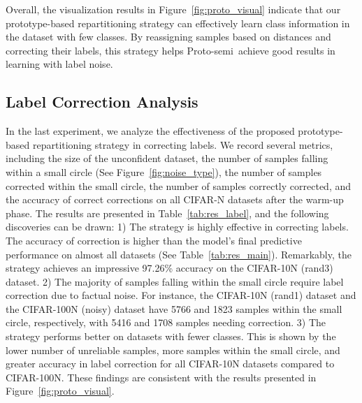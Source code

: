 \documentclass[letterpaper]{article} %
\newcommand{\method}{Proto-semi}
\begin{document}
Overall, the visualization results in Figure~\ref{fig:proto_visual} indicate that our prototype-based repartitioning strategy can effectively learn class information in the dataset with few classes. By reassigning samples based on distances and correcting their labels, this strategy helps \method\ achieve good results in learning with label noise.






\subsection{Label Correction Analysis}\label{sec:label_correct}

In the last experiment, we analyze the effectiveness of the proposed prototype-based repartitioning strategy in correcting labels. 
We record several metrics, including the size of the unconfident dataset, the number of samples falling within a small circle (See Figure~\ref{fig:noise_type}), the number of samples corrected within the small circle, the number of samples correctly corrected, and the accuracy of correct corrections on all CIFAR-N datasets after the warm-up phase. The results are presented in Table~\ref{tab:res_label}, and the following discoveries can be drawn: 1) The strategy is highly effective in correcting labels. The accuracy of correction is higher than the model's final predictive performance on almost all datasets (See Table~\ref{tab:res_main}). Remarkably, the strategy achieves an impressive 97.26\% accuracy on the CIFAR-10N (rand3) dataset. 2) The majority of samples falling within the small circle require label correction due to factual noise. For instance, the CIFAR-10N (rand1) dataset and the CIFAR-100N (noisy) dataset have 5766 and 1823 samples within the small circle, respectively, with 5416 and 1708 samples needing correction. 3) The strategy performs better on datasets with fewer classes. This is shown by the lower number of unreliable samples, more samples within the small circle, and greater accuracy in label correction for all CIFAR-10N datasets compared to CIFAR-100N. These findings are consistent with the results presented in Figure~\ref{fig:proto_visual}.
\end{document}
